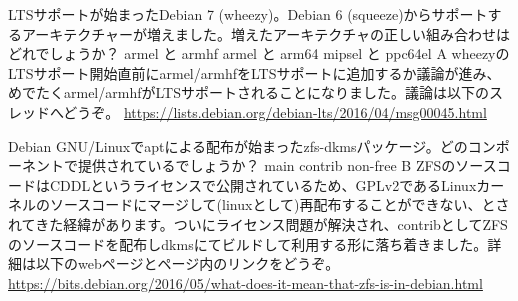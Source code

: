 %

\santaku
{LTSサポートが始まったDebian 7 (wheezy)。Debian 6 (squeeze)からサポートするアーキテクチャーが増えました。増えたアーキテクチャの正しい組み合わせはどれでしょうか？}
{armel と armhf}
{armel と arm64}
{mipsel と ppc64el}
{A}
{wheezyのLTSサポート開始直前にarmel/armhfをLTSサポートに追加するか議論が進み、めでたくarmel/armhfがLTSサポートされることになりました。議論は以下のスレッドへどうぞ。 \url{https://lists.debian.org/debian-lts/2016/04/msg00045.html}}

\santaku
{Debian GNU/Linuxでaptによる配布が始まったzfs-dkmsパッケージ。どのコンポーネントで提供されているでしょうか？}
{main}
{contrib}
{non-free}
{B}
{ZFSのソースコードはCDDLというライセンスで公開されているため、GPLv2であるLinuxカーネルのソースコードにマージして(linuxとして)再配布することができない、とされてきた経緯があります。ついにライセンス問題が解決され、contribとしてZFSのソースコードを配布しdkmsにてビルドして利用する形に落ち着きました。詳細は以下のwebページとページ内のリンクをどうぞ。 \url{https://bits.debian.org/2016/05/what-does-it-mean-that-zfs-is-in-debian.html}}
